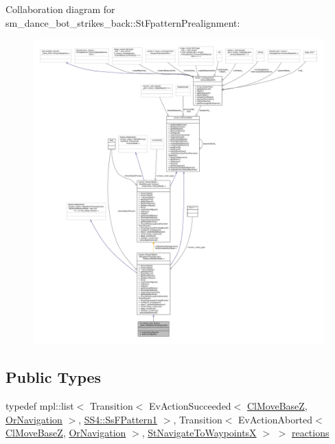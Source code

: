 Collaboration diagram for sm\+\_\+dance\+\_\+bot\+\_\+strikes\+\_\+back\+:\+:St\+Fpattern\+Prealignment\+:
\nopagebreak
\begin{figure}[H]
\begin{center}
\leavevmode
\includegraphics[width=350pt]{structsm__dance__bot__strikes__back_1_1StFpatternPrealignment__coll__graph}
\end{center}
\end{figure}
\subsection*{Public Types}
\begin{DoxyCompactItemize}
\item 
typedef mpl\+::list$<$ Transition$<$ Ev\+Action\+Succeeded$<$ \hyperlink{classcl__move__base__z_1_1ClMoveBaseZ}{Cl\+Move\+BaseZ}, \hyperlink{classsm__dance__bot__strikes__back_1_1OrNavigation}{Or\+Navigation} $>$, \hyperlink{structsm__dance__bot__strikes__back_1_1SS4_1_1SsFPattern1}{S\+S4\+::\+Ss\+F\+Pattern1} $>$, Transition$<$ Ev\+Action\+Aborted$<$ \hyperlink{classcl__move__base__z_1_1ClMoveBaseZ}{Cl\+Move\+BaseZ}, \hyperlink{classsm__dance__bot__strikes__back_1_1OrNavigation}{Or\+Navigation} $>$, \hyperlink{structsm__dance__bot__strikes__back_1_1StNavigateToWaypointsX}{St\+Navigate\+To\+WaypointsX} $>$ $>$ \hyperlink{structsm__dance__bot__strikes__back_1_1StFpatternPrealignment_a2954d92b15e04cee07bd0a5172df7f59}{reactions}
\end{DoxyCompactItemize}
